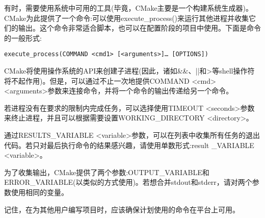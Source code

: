 
有时，需要使用系统中可用的工具(毕竟，CMake主要是一个构建系统生成器)。CMake为此提供了一个命令:可以使用execute\_process()来运行其他进程并收集它们的输出。这个命令非常适合脚本，也可以在配置阶段的项目中使用。下面是命令的一般形式:

\begin{lstlisting}[style=styleCMake]
execute_process(COMMAND <cmd1> [<arguments>]… [OPTIONS])
\end{lstlisting}

CMake将使用操作系统的API来创建子进程(因此，诸如\&\&、||和>等shell操作符将不起作用)。但是，可以通过不止一次地提供COMMAND <cmd> <arguments>参数来连接命令，并将一个命令的输出传递给另一个命令。

若进程没有在要求的限制内完成任务，可以选择使用TIMEOUT <seconds>参数来终止进程，并且可以根据需要设置WORKING\_DIRECTORY <directory>。

通过RESULTS\_VARIABLE <variable>参数，可以在列表中收集所有任务的退出代码。若只对最后执行命令的结果感兴趣，请使用单数形式:result \_VARIABLE <variable>。

为了收集输出，CMake提供了两个参数:OUTPUT\_VARIABLE和ERROR\_VARIABLE(以类似的方式使用)。若想合并stdout和stderr，请对两个参数使用相同的变量。

记住，在为其他用户编写项目时，应该确保计划使用的命令在平台上可用。
















